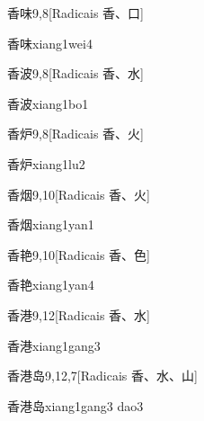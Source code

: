 \begin{entry}{香味}{9,8}[Radicais ⾹、⼝]
  \begin{phonetics}{香味}{xiang1wei4}
  \end{phonetics}
\end{entry}

\begin{entry}{香波}{9,8}[Radicais ⾹、⽔]
  \begin{phonetics}{香波}{xiang1bo1}
  \end{phonetics}
\end{entry}

\begin{entry}{香炉}{9,8}[Radicais ⾹、⽕]
  \begin{phonetics}{香炉}{xiang1lu2}
  \end{phonetics}
\end{entry}

\begin{entry}{香烟}{9,10}[Radicais ⾹、⽕]
  \begin{phonetics}{香烟}{xiang1yan1}
  \end{phonetics}
\end{entry}

\begin{entry}{香艳}{9,10}[Radicais ⾹、⾊]
  \begin{phonetics}{香艳}{xiang1yan4}
  \end{phonetics}
\end{entry}

\begin{entry}{香港}{9,12}[Radicais ⾹、⽔]
  \begin{phonetics}{香港}{xiang1gang3}
  \end{phonetics}
\end{entry}

\begin{entry}{香港岛}{9,12,7}[Radicais ⾹、⽔、⼭]
  \begin{phonetics}{香港岛}{xiang1gang3 dao3}
  \end{phonetics}
\end{entry}

